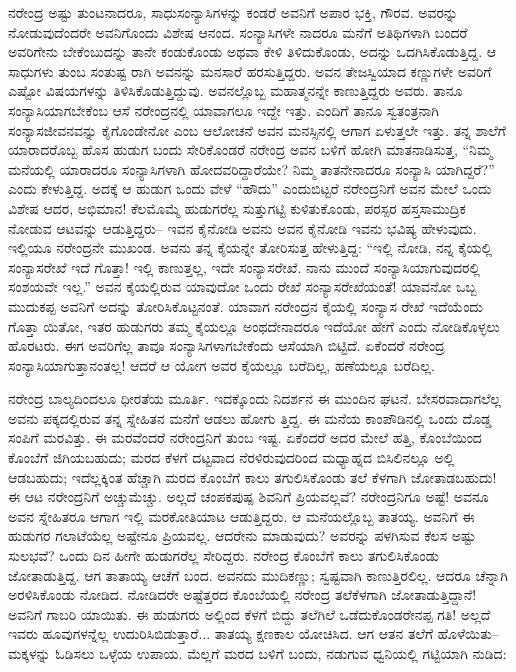 ನರೇಂದ್ರ ಅಷ್ಟು ತುಂಟನಾದರೂ, ಸಾಧುಸಂನ್ಯಾಸಿಗಳನ್ನು ಕಂಡರೆ ಅವನಿಗೆ ಅಪಾರ ಭಕ್ತಿ, ಗೌರವ. ಅವರನ್ನು ನೋಡುವುದೆಂದರೇ ಅವನಿಗೊಂದು ವಿಶೇಷ ಆನಂದ. ಸಂನ್ಯಾಸಿಗಳೇ ನಾದರೂ ಮನೆಗೆ ಅತಿಥಿಗಳಾಗಿ ಬಂದರೆ ಅವರಿಗೇನು ಬೇಕೆಂಬುದನ್ನು ತಾನೇ ಕಂಡುಕೊಂಡು ಅಥವಾ ಕೇಳಿ ತಿಳಿದುಕೊಂಡು, ಅದನ್ನು ಒದಗಿಸಿಕೊಡುತ್ತಿದ್ದ. ಆ ಸಾಧುಗಳು ತುಂಬ ಸಂತುಷ್ಟ ರಾಗಿ ಅವನನ್ನು ಮನಸಾರೆ ಹರಸುತ್ತಿದ್ದರು. ಅವನ ತೇಜಸ್ವಿಯಾದ ಕಣ್ಣುಗಳೇ ಅವರಿಗೆ ಎಷ್ಟೋ ವಿಷಯಗಳನ್ನು ತಿಳಿಸಿಕೊಡುತ್ತಿದ್ದುವು. ಅವನಲ್ಲೊಬ್ಬ ಮಹಾತ್ಮನನ್ನೇ ಕಾಣುತ್ತಿದ್ದರು ಅವರು. ತಾನೂ ಸಂನ್ಯಾಸಿಯಾಗಬೇಕೆಂಬ ಆಸೆ ನರೇಂದ್ರನಲ್ಲಿ ಯಾವಾಗಲೂ ಇದ್ದೇ ಇತ್ತು. ಎಂದಿಗೆ ತಾನೂ ಸ್ವತಂತ್ರನಾಗಿ ಸಂನ್ಯಾಸಜೀವನವನ್ನು ಕೈಗೊಂಡೇನೋ ಎಂಬ ಆಲೋಚನೆ ಅವನ ಮನಸ್ಸಿನಲ್ಲಿ ಆಗಾಗ ಏಳುತ್ತಲೇ ಇತ್ತು. ತನ್ನ ಶಾಲೆಗೆ ಯಾರಾದರೊಬ್ಬ ಹೊಸ ಹುಡುಗ ಬಂದು ಸೇರಿಕೊಂಡರೆ ನರೇಂದ್ರ ಅವನ ಬಳಿಗೆ ಹೋಗಿ ಮಾತನಾಡಿಸುತ್ತ, “ನಿಮ್ಮ ಮನೆಯಲ್ಲಿ ಯಾರಾದರೂ ಸಂನ್ಯಾಸಿಗಳಾಗಿ ಹೋದವರಿದ್ದಾರೆಯೇ? ನಿಮ್ಮ ತಾತನೇನಾದರೂ ಸಂನ್ಯಾಸಿ ಯಾಗಿದ್ದರೆ?” ಎಂದು ಕೇಳುತ್ತಿದ್ದ. ಅದಕ್ಕೆ ಆ ಹುಡುಗ ಒಂದು ವೇಳೆ “ಹೌದು” ಎಂದುಬಿಟ್ಟರೆ ನರೇಂದ್ರನಿಗೆ ಅವನ ಮೇಲೆ ಒಂದು ವಿಶೇಷ ಆದರ, ಅಭಿಮಾನ! ಕೆಲಮೊಮ್ಮೆ ಹುಡುಗರೆಲ್ಲ ಸುತ್ತುಗಟ್ಟಿ ಕುಳಿತುಕೊಂಡು, ಪರಸ್ಪರ ಹಸ್ತಸಾಮುದ್ರಿಕ ನೋಡುವ ಆಟವನ್ನು ಆಡುತ್ತಿದ್ದರು– ಇವನ ಕೈನೋಡಿ ಅವನು ಅವನ ಕೈನೋಡಿ ಇವನು ಭವಿಷ್ಯ ಹೇಳುವುದು. ಇಲ್ಲಿಯೂ ನರೇಂದ್ರನೇ ಮುಖಂಡ. ಅವನು ತನ್ನ ಕೈಯನ್ನೇ ತೋರಿಸುತ್ತ ಹೇಳುತ್ತಿದ್ದ: “ಇಲ್ಲಿ ನೋಡಿ, ನನ್ನ ಕೈಯಲ್ಲಿ ಸಂನ್ಯಾಸರೇಖೆ ಇದೆ ಗೊತ್ತಾ! ಇಲ್ಲಿ ಕಾಣುತ್ತಲ್ಲ, ಇದೇ ಸಂನ್ಯಾಸರೇಖೆ. ನಾನು ಮುಂದೆ ಸಂನ್ಯಾಸಿಯಾಗುವುದರಲ್ಲಿ ಸಂಶಯವೇ ಇಲ್ಲ.” ಅವನ ಕೈಯಲ್ಲಿರುವ ಯಾವುದೋ ಒಂದು ರೇಖೆ ಸಂನ್ಯಾಸರೇಖೆಯಂತೆ! ಯಾವನೋ ಒಬ್ಬ ಮುದುಕಪ್ಪ ಅವನಿಗೆ ಅದನ್ನು ತೋರಿಸಿಕೊಟ್ಟನಂತೆ. ಯಾವಾಗ ನರೇಂದ್ರನ ಕೈಯಲ್ಲಿ ಸಂನ್ಯಾಸ ರೇಖೆ ಇದೆಯೆಂದು ಗೊತ್ತಾ ಯಿತೋ, ಇತರ ಹುಡುಗರು ತಮ್ಮ ಕೈಯಲ್ಲೂ ಅಂಥದೇನಾದರೂ ಇದೆಯೋ ಹೇಗೆ ಎಂದು ನೋಡಿಕೊಳ್ಳಲು ಹೊರಟರು. ಈಗ ಅವರಿಗೆಲ್ಲ ತಾವೂ ಸಂನ್ಯಾಸಿಗಳಾಗಬೇಕೆಂದು ಆಸೆಯಾಗಿ ಬಿಟ್ಟಿದೆ. ಏಕೆಂದರೆ ನರೇಂದ್ರ ಸಂನ್ಯಾಸಿಯಾಗುತ್ತಾನಂತಲ್ಲ! ಆದರೆ ಆ ಯೋಗ ಅವರ ಕೈಯಲ್ಲೂ ಬರೆದಿಲ್ಲ, ಹಣೆಯಲ್ಲೂ ಬರೆದಿಲ್ಲ.

ನರೇಂದ್ರ ಬಾಲ್ಯದಿಂದಲೂ ಧೀರತೆಯ ಮೂರ್ತಿ. ಇದಕ್ಕೊಂದು ನಿದರ್ಶನ ಈ ಮುಂದಿನ ಘಟನೆ. ಬೇಸರವಾದಾಗಲೆಲ್ಲ ಅವನು ಪಕ್ಕದಲ್ಲಿರುವ ತನ್ನ ಸ್ನೇಹಿತನ ಮನೆಗೆ ಆಡಲು ಹೋಗು ತ್ತಿದ್ದ. ಈ ಮನೆಯ ಕಾಂಪೌಡಿನಲ್ಲಿ ಒಂದು ದೊಡ್ಡ ಸಂಪಿಗೆ ಮರವಿತ್ತು. ಈ ಮರವೆಂದರೆ ನರೇಂದ್ರನಿಗೆ ತುಂಬ ಇಷ್ಟ. ಏಕೆಂದರೆ ಅದರ ಮೇಲೆ ಹತ್ತಿ, ಕೊಂಬೆಯಿಂದ ಕೊಂಬೆಗೆ ಜಿಗಿಯಬಹುದು; ಮರದ ಕೆಳಗೆ ದಟ್ಟವಾದ ನೆರಳಿರುವುದರಿಂದ ಮಧ್ಯಾಹ್ನದ ಬಿಸಿಲಿನಲ್ಲೂ ಅಲ್ಲಿ ಆಡಬಹುದು; ಇದೆಲ್ಲಕ್ಕಿಂತ ಹೆಚ್ಚಾಗಿ ಮರದ ಕೊಂಬೆಗೆ ಕಾಲು ತಗುಲಿಸಿಕೊಂಡು ತಲೆ ಕೆಳಗಾಗಿ ಜೋತಾಡಬಹುದು! ಈ ಆಟ ನರೇಂದ್ರನಿಗೆ ಅಚ್ಚುಮೆಚ್ಚು. ಅಲ್ಲದೆ ಚಂಪಕಪುಷ್ಪ ಶಿವನಿಗೆ ಪ್ರಿಯವಲ್ಲವೆ? ನರೇಂದ್ರನಿಗೂ ಅಷ್ಟೆ! ಅವನೂ ಅವನ ಸ್ನೇಹಿತರೂ ಆಗಾಗ ಇಲ್ಲಿ ಮರಕೋತಿಯಾಟ ಆಡುತ್ತಿದ್ದರು. ಆ ಮನೆಯಲ್ಲೊಬ್ಬ ತಾತಯ್ಯ. ಅವನಿಗೆ ಈ ಹುಡುಗರ ಗಲಾಟೆಯೆಲ್ಲ ಅಷ್ಟೇನೂ ಪ್ರಿಯವಲ್ಲ. ಆದರೇನು ಮಾಡುವುದು? ಅವರನ್ನು ಪಳಗಿಸುವ ಕೆಲಸ ಅಷ್ಟು ಸುಲಭವೆ? ಒಂದು ದಿನ ಹೀಗೇ ಹುಡುಗರೆಲ್ಲ ಸೇರಿದ್ದರು. ನರೇಂದ್ರ ಕೊಂಬೆಗೆ ಕಾಲು ತಗುಲಿಸಿಕೊಂಡು ಜೋತಾಡುತ್ತಿದ್ದ. ಆಗ ತಾತಾಯ್ಯ ಆಚೆಗೆ ಬಂದ. ಅವನದು ಮುದಿಕಣ್ಣು; ಸ್ವಷ್ಟವಾಗಿ ಕಾಣುತ್ತಿರಲಿಲ್ಲ. ಆದರೂ ಚೆನ್ನಾಗಿ ಅರಳಿಸಿಕೊಂಡು ನೋಡಿದ. ನೋಡಿದರೇ ಅಷ್ಟೆತ್ತರದ ಕೊಂಬೆಯಲ್ಲಿ ನರೇಂದ್ರ ತಲೆಕೆಳಗಾಗಿ ಜೋತಾಡುತ್ತಿದ್ದಾನೆ! ಅವನಿಗೆ ಗಾಬರಿ ಯಾಯಿತು. ಈ ಹುಡುಗರು ಅಲ್ಲಿಂದ ಕೆಳಗೆ ಬಿದ್ದು ತಲೆಗಿಲೆ ಒಡೆದುಕೊಂಡರೇನಪ್ಪ ಗತಿ! ಅಲ್ಲದೆ ಇವರು ಹೂವುಗಳನ್ನೆಲ್ಲ ಉದುರಿಸಿಬಿಡುತ್ತಾರೆ... ತಾತಯ್ಯ ಕ್ಷಣಕಾಲ ಯೋಚಿಸಿದ. ಆಗ ಆತನ ತಲೆಗೆ ಹೊಳೆಯಿತು–ಮಕ್ಕಳನ್ನು ಓಡಿಸಲು ಒಳ್ಳೆಯ ಉಪಾಯ. ಮೆಲ್ಲಗೆ ಮರದ ಬಳಿಗೆ ಬಂದು, ನಡುಗುವ ಧ್ವನಿಯಲ್ಲಿ ಗಟ್ಟಿಯಾಗಿ ನುಡಿದ:

